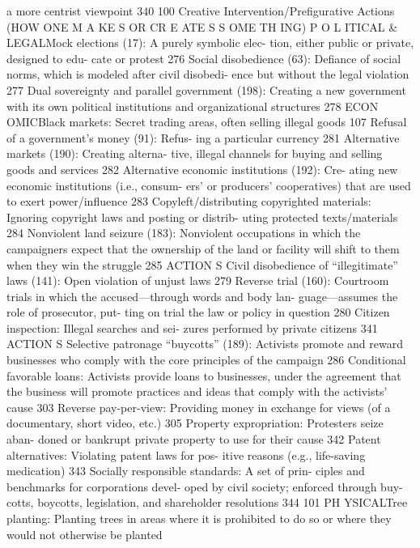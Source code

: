 \documentclass[twoside,a4paper,12pt,fleqn,openany]{extbook}
\begin{document}
a more centrist viewpoint
 340
100
Creative Intervention/Prefigurative Actions
(HOW ONE M A KE S OR CR E ATE S S OME TH ING)
P O L ITICAL & LEGALMock elections (17): A purely symbolic elec-
tion, either public or private, designed to edu-
cate or protest
 276
Social disobedience (63): Defiance of social
norms, which is modeled after civil disobedi-
ence but without the legal violation
 277
Dual sovereignty and parallel government
(198): Creating a new government with its
own political institutions and organizational
structures
 278
ECON OMICBlack markets: Secret trading areas, often
selling illegal goods
 107
Refusal of a government’s money (91): Refus-
ing a particular currency
 281
Alternative markets (190): Creating alterna-
tive, illegal channels for buying and selling
goods and services
 282
Alternative economic institutions (192): Cre-
ating new economic institutions (i.e., consum-
ers’ or producers’ cooperatives) that are used
to exert power/influence
 283
Copyleft/distributing copyrighted materials:
Ignoring copyright laws and posting or distrib-
uting protected texts/materials
 284
Nonviolent land seizure (183): Nonviolent
occupations in which the campaigners expect
that the ownership of the land or facility will
shift to them when they win the struggle 285
ACTION S
Civil disobedience of “illegitimate” laws (141):
Open violation of unjust laws
 279
Reverse trial (160): Courtroom trials in which
the accused—through words and body lan-
guage—assumes the role of prosecutor, put-
ting on trial the law or policy in question 280
Citizen inspection: Illegal searches and sei-
zures performed by private citizens
 341
ACTION S
Selective patronage “buycotts” (189): Activists
promote and reward businesses who comply
with the core principles of the campaign 286
Conditional favorable loans: Activists provide
loans to businesses, under the agreement that
the business will promote practices and ideas
that comply with the activists’ cause
 303
Reverse pay-per-view: Providing money in
exchange for views (of a documentary, short
video, etc.)
 305
Property expropriation: Protesters seize aban-
doned or bankrupt private property to use for
their cause
 342
Patent alternatives: Violating patent laws for pos-
itive reasons (e.g., life-saving medication) 343
Socially responsible standards: A set of prin-
ciples and benchmarks for corporations devel-
oped by civil society; enforced through buy-
cotts, boycotts, legislation, and shareholder
resolutions
 344
101
PH YSICALTree planting: Planting trees in areas where it
is prohibited to do so or where they would not
otherwise be planted
\end{document}
